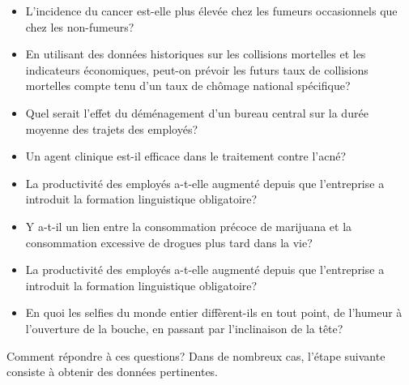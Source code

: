 \begin{itemize}[noitemsep]
\item L'incidence du cancer est-elle plus élevée chez les fumeurs occasionnels que chez les non-fumeurs? 
\item En utilisant des données historiques sur les collisions mortelles et les indicateurs économiques, peut-on prévoir les futurs taux de collisions mortelles compte tenu d'un taux de chômage national spécifique?
\item Quel serait l'effet du déménagement d'un bureau central sur la durée moyenne des trajets des employés?  
\item Un agent clinique est-il efficace dans le traitement contre l'acné?
\item La productivité des employés a-t-elle augmenté depuis que l'entreprise a introduit la formation linguistique obligatoire? \item Y a-t-il un lien entre la consommation précoce de marijuana et la consommation excessive de drogues plus tard dans la vie? 
\item La productivité des employés a-t-elle augmenté depuis que l'entreprise a introduit la formation linguistique obligatoire? 
\item En quoi les selfies du monde entier diffèrent-ils en tout point, de l'humeur à l'ouverture de la bouche, en passant par l'inclinaison de la tête?
\end{itemize}
\noindent Comment répondre à ces questions? Dans de nombreux cas, l'étape suivante consiste à obtenir des données pertinentes.   
